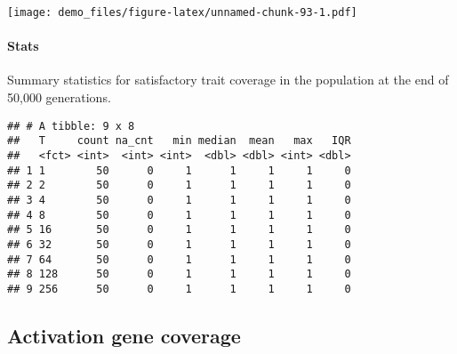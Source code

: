 \documentclass[]{book}
\newenvironment{Shaded}{\begin{snugshade}}{\end{snugshade}}
\newcommand{\DataTypeTok}[1]{\textcolor[rgb]{0.13,0.29,0.53}{#1}}
\newcommand{\KeywordTok}[1]{\textcolor[rgb]{0.13,0.29,0.53}{\textbf{#1}}}
\newcommand{\NormalTok}[1]{#1}
\newcommand{\OperatorTok}[1]{\textcolor[rgb]{0.81,0.36,0.00}{\textbf{#1}}}
\newcommand{\OtherTok}[1]{\textcolor[rgb]{0.56,0.35,0.01}{#1}}
\newcommand{\StringTok}[1]{\textcolor[rgb]{0.31,0.60,0.02}{#1}}
\let\oldparagraph\paragraph
\renewcommand{\paragraph}[1]{\oldparagraph{#1}\mbox{}}
\begin{document}
\texttt{[image: demo\_files/figure-latex/unnamed-chunk-93-1.pdf]}

\hypertarget{stats-16}{%
\paragraph{Stats}\label{stats-16}}

Summary statistics for satisfactory trait coverage in the population at the end of 50,000 generations.

\begin{Shaded}
\end{Shaded}

\begin{verbatim}
## # A tibble: 9 x 8
##   T     count na_cnt   min median  mean   max   IQR
##   <fct> <int>  <int> <int>  <dbl> <dbl> <int> <dbl>
## 1 1        50      0     1      1     1     1     0
## 2 2        50      0     1      1     1     1     0
## 3 4        50      0     1      1     1     1     0
## 4 8        50      0     1      1     1     1     0
## 5 16       50      0     1      1     1     1     0
## 6 32       50      0     1      1     1     1     0
## 7 64       50      0     1      1     1     1     0
## 8 128      50      0     1      1     1     1     0
## 9 256      50      0     1      1     1     1     0
\end{verbatim}

\hypertarget{activation-gene-coverage-2}{%
\subsection{Activation gene coverage}\label{activation-gene-coverage-2}}
\end{document}
